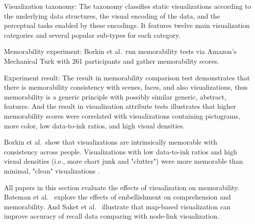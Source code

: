 \documentclass{egpubl}
\begin{document}
Visualization taxonomy: The taxonomy classifies static visualizations according to the underlying data structures, the visual encoding of the data, and the perceptual tasks enabled by these encodings. It features twelve main visualization categories and several popular sub-types for each category.

Memorability experiment: Borkin et al.\ run memorability tests via Amazon's Mechanical Turk with 261 participants and gather memorability scores.

Experiment result: The result in memorability comparison test demonstrates that there is memorability consistency with scenes, faces, and also visualizations, thus memorability is a generic principle with possibly similar generic, abstract, features. And the result in visualization attribute tests illustrates that higher memorability scores were correlated with visualizations containing pictograms, more color, low data-to-ink ratios, and high visual densities.

Borkin et al.\ show that visualizations are intrinsically memorable with consistency across people. Visualizations with low data-to-ink ratios and high visual densities (i.e., more chart junk and "clutter") were more memorable than minimal, "clean" visualizations \cite{borkin2013makes}. 



All papers in this section evaluate the effects of visualization on memorability. Bateman et al.\ \cite{bateman} explore the effects of embellishment on comprehension and memorability. And Saket et al.\ \cite{saket2015} illustrate that map-based visualization can improve accuracy of recall data comparing with node-link visualization.
\end{document}
